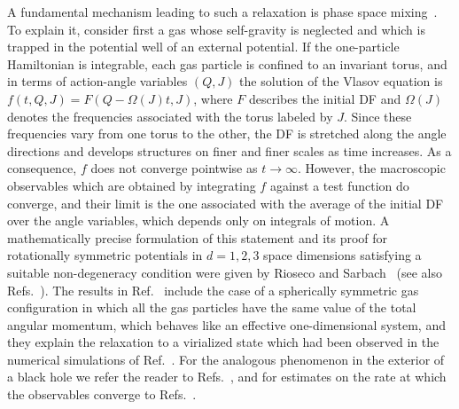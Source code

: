 A fundamental mechanism leading to such a relaxation is phase space mixing~\cite{dL62,dL67}. To explain it, consider first a gas whose self-gravity is neglected and which is trapped in the potential well of an external potential. If the one-particle Hamiltonian is integrable, each gas particle is confined to an invariant torus, and in terms of action-angle variables $(Q,J)$ the solution of the Vlasov equation is $f(t,Q,J) = F(Q - \Omega(J)t,J)$, where $F$ describes the initial DF and $\Omega(J)$ denotes the frequencies associated with the torus labeled by $J$. Since these frequencies vary from one torus to the other, the DF is stretched along the angle directions and develops structures on finer and finer scales as time increases. As a consequence, $f$ does not converge pointwise as $t\to\infty$. However, the macroscopic observables which are obtained by integrating $f$ against a test function do converge, and their limit is the one associated with the average of the initial DF over the angle variables, which depends only on integrals of motion. A mathematically precise formulation of this statement and its proof for rotationally symmetric potentials in $d = 1,2,3$ space dimensions satisfying a suitable non-degeneracy condition were given by Rioseco and Sarbach~\cite{pRoS20} (see also Refs.~\cite{sTmHdL86,cM19}). The results in Ref.~\cite{pRoS20} include the case of a spherically symmetric gas configuration in which all the gas particles have the same value of the total angular momentum, which behaves like an effective one-dimensional system, and they explain the relaxation to a virialized state which had been observed in the numerical simulations of Ref.~\cite{pDeJmAeMdN17}. For the analogous phenomenon in the exterior of a black hole we refer the reader to Refs.~\cite{pRoS18,pRoS24}, and for estimates on the rate at which the observables converge to Refs.~\cite{mMpRhV22,sCjL22,mHgRmScS24}.

